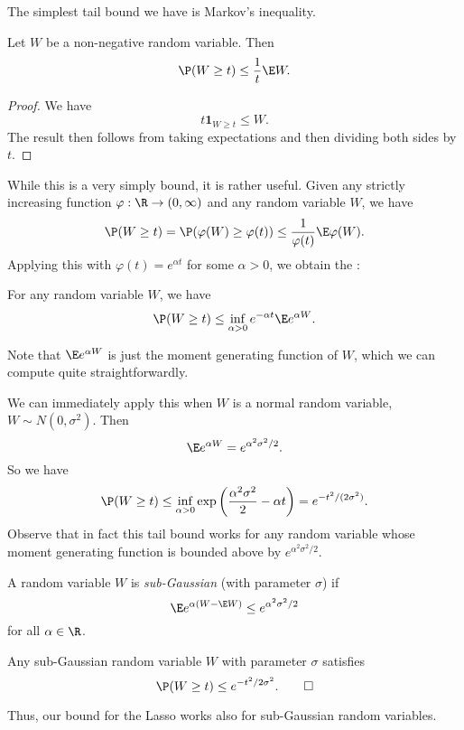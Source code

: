 \documentclass[a4paper]{article}
\begin{document}
The simplest tail bound we have is Markov's inequality.
\begin{lemma}
  Let $W$ be a non-negative random variable. Then
  \[
    \P(W \geq t) \leq \frac{1}{t} \E W.
  \]
\end{lemma}

\begin{proof}
  We have
  \[
    t \mathbf{1}_{W \geq t} \leq W.
  \]
  The result then follows from taking expectations and then dividing both sides by $t$.
\end{proof}

While this is a very simply bound, it is rather useful. Given any strictly increasing function $\varphi: \R \to (0, \infty)$ and any random variable $W$, we have
\[
  \P(W \geq t) = \P(\varphi(W) \geq \varphi(t))\leq \frac{1}{\varphi(t)} \E \varphi(W).
\]
Applying this with $\varphi (t) = e^{\alpha t}$ for some $\alpha > 0$, we obtain the :
\begin{cor}
  For any random variable $W$, we have
  \[
    \P(W \geq t) \leq \inf_{\alpha > 0} e^{-\alpha t} \E e^{\alpha W}.
  \]
\end{cor}
Note that $\E e^{\alpha W}$ is just the moment generating function of $W$, which we can compute quite straightforwardly.

We can immediately apply this when $W$ is a normal random variable, $W \sim N(0, \sigma^2)$. Then
\[
  \E e^{\alpha W} = e^{\alpha^2 \sigma^2/2}.
\]
So we have
\[
  \P(W \geq t) \leq \inf_{\alpha > 0}\exp \left(\frac{\alpha^2 \sigma^2}{2} - \alpha t\right) = e^{-t^2/(2\sigma^2)}.
\]
Observe that in fact this tail bound works for any random variable whose moment generating function is bounded above by $e^{\alpha^2 \sigma^2/2}$.

\begin{defi}
  A random variable $W$ is \emph{sub-Gaussian} (with parameter $\sigma$) if
  \[
    \E e^{\alpha (W - \E W)} \leq e^{\alpha^2 \sigma^2/2}
  \]
  for all $\alpha \in \R$.
\end{defi}

\begin{cor}
  Any sub-Gaussian random variable $W$ with parameter $\sigma$ satisfies
  \[
    \P(W \geq t) \leq e^{-t^2/2\sigma^2}.\tag*{$\square$}
  \]
\end{cor}
Thus, our bound for the Lasso works also for sub-Gaussian random variables.
\end{document}

